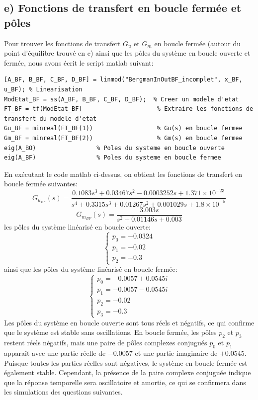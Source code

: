 \subsection*{e) Fonctions de transfert en boucle fermée et pôles}
Pour trouver les fonctions de transfert $G_u$ et $G_m$ en boucle fermée (autour du point d'équilibre trouvé en c) ainsi que les pôles du système en boucle ouverte et fermée, nous avons écrit le script matlab suivant:
\begin{lstlisting}[style=matlab]
[A_BF, B_BF, C_BF, D_BF] = linmod("BergmanInOutBF_incomplet", x_BF, u_BF); % Linearisation
ModEtat_BF = ss(A_BF, B_BF, C_BF, D_BF);  % Creer un modele d'etat
FT_BF = tf(ModEtat_BF)                     % Extraire les fonctions de transfert du modele d'etat
Gu_BF = minreal(FT_BF(1))                  % Gu(s) en boucle fermee
Gm_BF = minreal(FT_BF(2))                  % Gm(s) en boucle fermee
eig(A_BO)                 % Poles du systeme en boucle ouverte
eig(A_BF)                 % Poles du systeme en boucle fermee
\end{lstlisting}
En exécutant le code matlab ci-dessus, on obtient les fonctions de transfert en boucle fermée suivantes:
$$\boxed{G_{u_{BF}}(s)=\frac{0.1083s^3+0.03467s^2-0.0003252s+1.371\times 10^{-23}}{s^4+0.3315s^3+0.01267s^2+0.001029s+1.8\times 10^{-5}}}$$
$$\boxed{G_{m_{BF}}(s)=\frac{3.003s}{s^2+0.01146s+0.003}}$$
les pôles du système linéarisé en boucle ouverte:
$$\begin{cases}
p_0 = -0.0324\\
p_1 = -0.02\\
p_2 = -0.3
\end{cases}$$
ainsi que les pôles du système linéarisé en boucle fermée:
$$\begin{cases}
p_0 = -0.0057+0.0545i\\
p_1 = -0.0057-0.0545i\\
p_2 = -0.02\\
p_3 = -0.3
\end{cases}$$
\noindent Les pôles du système en boucle ouverte sont tous réels et négatifs, ce qui confirme que le système est stable sans oscillations. En boucle fermée, les pôles $p_2$ et $p_3$ restent réels négatifs, mais une paire de pôles complexes conjugués $p_0$ et $p_1$ apparaît avec une partie réelle de $-0.0057$ et une partie imaginaire de $\pm 0.0545$. Puisque toutes les parties réelles sont négatives, le système en boucle fermée est également stable. Cependant, la présence de la paire complexe conjuguée indique que la réponse temporelle sera oscillatoire et amortie, ce qui se confirmera dans les simulations des questions suivantes.

